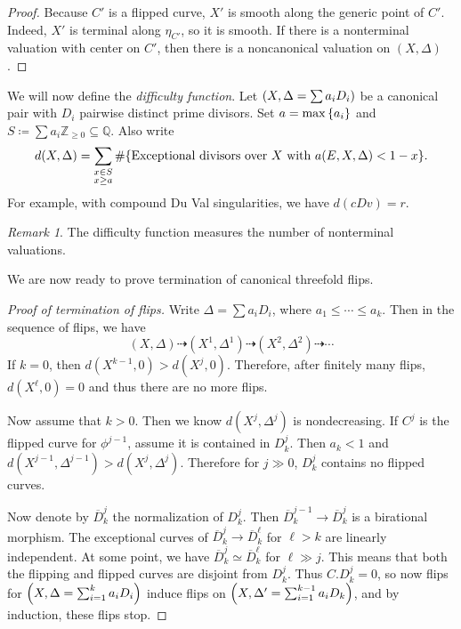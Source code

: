 \documentclass[leqno, openany]{memoir}
\theoremstyle{definition}
\theoremstyle{remark}
\newtheorem{rmk}[thm]{Remark}
\theoremstyle{plain}
\theoremstyle{definition}
\theoremstyle{remark}
\newcommand{\Z}{\mathbb{Z}}
\newcommand{\Q}{\mathbb{Q}}
\newcommand{\ol}[1]{\overline{#1}}
\begin{document}
\begin{proof}
    Because $C'$ is a flipped curve, $X'$ is smooth along the generic point of $C'$. Indeed, $X'$ is terminal along $\eta_{C'}$, so it is smooth. If there is a nonterminal valuation with center on $C'$, then there is a noncanonical valuation on $(X, \Delta)$.
\end{proof}

We will now define the \textit{difficulty function}. Let $\qty(X, \Delta = \sum a_i D_i)$ be a canonical pair with $D_i$ pairwise distinct prime divisors. Set $a = \max \qty{a_i}$ and $S \coloneqq \sum a_i \Z_{\geq 0} \subseteq \Q$. Also write
\[ d(X, \Delta) = \sum_{\substack{x \in S \\ x \geq a}} \# \qty{\text{Exceptional divisors over $X$ with $a(E, X, \Delta) < 1-x$}}. \]
For example, with compound Du Val singularities, we have $d(cDv) = r$.

\begin{rmk}
    The difficulty function measures the number of nonterminal valuations.
\end{rmk}

We are now ready to prove termination of canonical threefold flips.

\begin{proof}[Proof of termination of flips]
    Write $\Delta = \sum a_i D_i$, where $a_1 \leq \cdots \leq a_k$. Then in the sequence of flips, we have 
    \[ (X, \Delta) \dashrightarrow (X^1, \Delta^1) \dashrightarrow (X^2, \Delta^2) \dashrightarrow \cdots \]
    If $k = 0$, then $d(X^{k-1}, 0) > d(X^j, 0)$. Therefore, after finitely many flips, $d(X^{\ell}, 0) = 0$ and thus there are no more flips.

    Now assume that $k > 0$. Then we know $d(X^j, \Delta^j)$ is nondecreasing. If $C^j$ is the flipped curve for $\phi^{j-1}$, assume it is contained in $D_k^j$. Then $a_k < 1$ and $d(X^{j-1}, \Delta^{j-1}) > d(X^j, \Delta^j)$. Therefore for $j \gg 0$, $D_k^j$ contains no flipped curves.

    Now denote by $\ol{D}_k^j$ the normalization of $D_k^j$. Then $\ol{D}_k^{j-1} \to \ol{D}_k^j$ is a birational morphism. The exceptional curves of $\ol{D}_k^j \to \ol{D}_k^{\ell}$ for $\ell > k$ are linearly independent. At some point, we have $\ol{D}_k^j \simeq \ol{D}_k^{\ell}$ for $\ell \gg j$. This means that both the flipping and flipped curves are disjoint from $D_k^j$. Thus $C.D_k^j = 0$, so now flips for $\qty(X, \Delta = \sum_{i=1}^k a_i D_i)$ induce flips on $\qty(X, \Delta' = \sum_{i=1}^{k-1} a_i D_k)$, and by induction, these flips stop.
\end{proof}
\end{document}
